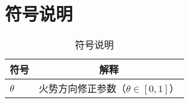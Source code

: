 \section{符号说明}\label{sec:Notation}

\begin{table}[H]
    \centering
    \caption{符号说明}
    \label{tab:fire_symbols}
    \begin{tabular}{lc}
        \toprule
        符号 & 解释 \\
        \midrule
        $\theta$          & 火势方向修正参数（$\theta \in [0,1]$） \\
        \bottomrule
    \end{tabular}
\end{table}
